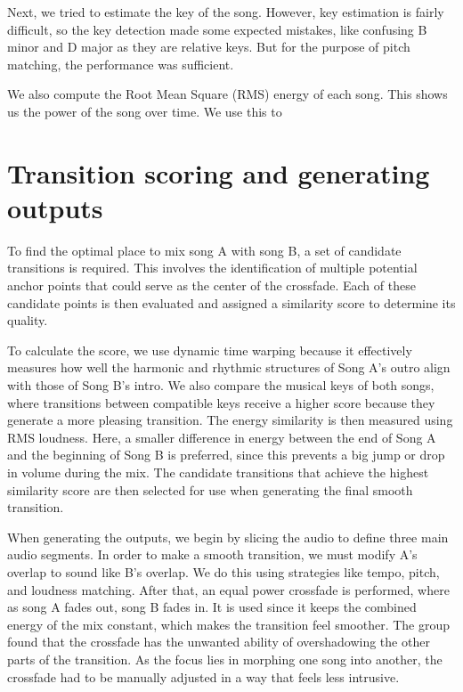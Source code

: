 \documentclass{article}
\begin{document}
Next, we tried to estimate the key of the song. However, key estimation is fairly difficult, so the key detection made some expected mistakes, like confusing B minor and D major as they are relative keys. But for the purpose of pitch matching, the performance was sufficient.

We also compute the Root Mean Square (RMS) energy of each song. This shows us the power of the song over time. We use this to 


\section{Transition scoring and generating outputs}

To find the optimal place to mix song A with song B, a set of candidate transitions is required. This involves the identification of multiple potential anchor points that could serve as the center of the crossfade. Each of these candidate points is then evaluated and assigned a similarity score to determine its quality. 

To calculate the score, we use dynamic time warping because it effectively measures how well the harmonic and rhythmic structures of Song A's outro align with those of Song B's intro. We also compare the musical keys of both songs, where transitions between compatible keys receive a higher score because they generate a more pleasing transition. The energy similarity is then measured using RMS loudness. Here, a smaller difference in energy between the end of Song A and the beginning of Song B is preferred, since this prevents a big jump or drop in volume during the mix. The candidate transitions that achieve the highest similarity score are then selected for use when generating the final smooth transition.

When generating the outputs, we begin by slicing the audio to define three main audio segments. In order to make a smooth transition, we must modify A's overlap to sound like B's overlap. We do this using strategies like tempo, pitch, and loudness matching. After that, an equal power crossfade is performed, where as song A fades out, song B fades in. It is used since it keeps the combined energy of the mix constant, which makes the transition feel smoother. The group found that the crossfade has the unwanted ability of overshadowing the other parts of the transition. As the focus lies in morphing one song into another, the crossfade had to be manually adjusted in a way that feels less intrusive.
\end{document}
